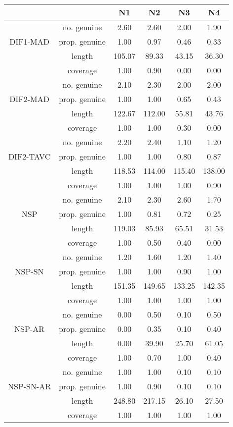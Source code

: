 \begin{tabular}{|c|c|c|c|c|c|}
  \hline
 &  & N1 & N2 & N3 & N4 \\ 
  \hline
 & no. genuine & 2.60 & 2.60 & 2.00 & 1.90 \\ 
  DIF1-MAD & prop. genuine & 1.00 & 0.97 & 0.46 & 0.33 \\ 
   & length & 105.07 & 89.33 & 43.15 & 36.30 \\ 
   & coverage & 1.00 & 0.90 & 0.00 & 0.00 \\ 
   & no. genuine & 2.10 & 2.30 & 2.00 & 2.00 \\ 
  DIF2-MAD & prop. genuine & 1.00 & 1.00 & 0.65 & 0.43 \\ 
   & length & 122.67 & 112.00 & 55.81 & 43.76 \\ 
   & coverage & 1.00 & 1.00 & 0.30 & 0.00 \\ 
   & no. genuine & 2.20 & 2.40 & 1.10 & 1.20 \\ 
  DIF2-TAVC & prop. genuine & 1.00 & 1.00 & 0.80 & 0.87 \\ 
   & length & 118.53 & 114.00 & 115.40 & 138.00 \\ 
   & coverage & 1.00 & 1.00 & 1.00 & 0.90 \\ 
   & no. genuine & 2.10 & 2.30 & 2.60 & 1.70 \\ 
  NSP & prop. genuine & 1.00 & 0.81 & 0.72 & 0.25 \\ 
   & length & 119.03 & 85.93 & 65.51 & 31.53 \\ 
   & coverage & 1.00 & 0.50 & 0.40 & 0.00 \\ 
   & no. genuine & 1.20 & 1.60 & 1.20 & 1.40 \\ 
  NSP-SN & prop. genuine & 1.00 & 1.00 & 0.90 & 1.00 \\ 
   & length & 151.35 & 149.65 & 133.25 & 142.35 \\ 
   & coverage & 1.00 & 1.00 & 1.00 & 1.00 \\ 
   & no. genuine & 0.00 & 0.50 & 0.10 & 0.50 \\ 
  NSP-AR & prop. genuine & 0.00 & 0.35 & 0.10 & 0.40 \\ 
   & length & 0.00 & 39.90 & 25.70 & 61.05 \\ 
   & coverage & 1.00 & 0.70 & 1.00 & 0.40 \\ 
   & no. genuine & 1.00 & 1.00 & 0.10 & 0.10 \\ 
  NSP-SN-AR & prop. genuine & 1.00 & 0.90 & 0.10 & 0.10 \\ 
   & length & 248.80 & 217.15 & 26.10 & 27.50 \\ 
   & coverage & 1.00 & 1.00 & 1.00 & 1.00 \\ 
   \hline
\end{tabular}
